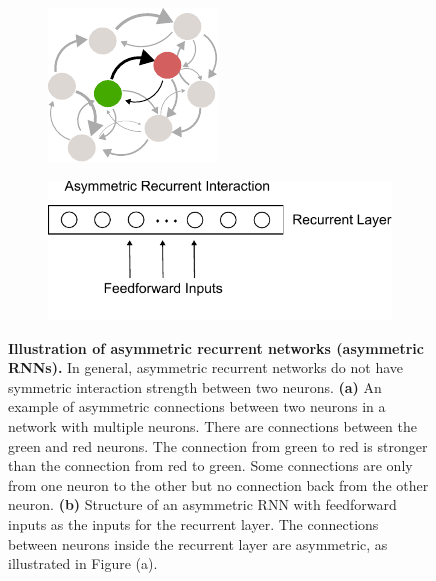 \documentclass[11pt]{article}
\begin{document}
{	\begin{figure}[H] 
		\begin{subfigure}[b]{0.4\textwidth}
			\centering
			\includegraphics[width=0.2\textheight]{../figures/asym_net.pdf}
			\vspace{0.2cm}
			\caption{}
		\end{subfigure}
		\hspace{0.4cm}
		\begin{subfigure}[b]{0.4\textwidth}
			\centering
			\includegraphics[width=0.4\textheight]{../figures/asym_recurrent.pdf}
			\caption{}
		\end{subfigure}
		\caption{\textbf{Illustration of asymmetric recurrent networks (asymmetric RNNs).} In general, asymmetric recurrent networks do not have symmetric interaction strength between two neurons. \textbf{(a)} An example of asymmetric connections between two neurons in a network with multiple neurons. There are connections between the green and red neurons. The connection from green to red is stronger than the connection from red to green. Some connections are only from one neuron to the other but no connection back from the other neuron.  \textbf{(b)} Structure of an asymmetric RNN with feedforward inputs as the inputs for the recurrent layer. The connections between neurons inside the recurrent layer are asymmetric, as illustrated in Figure (a).}
		\label{fig:asymmetric_RNN}
	\end{figure}
	
}
\end{document}
